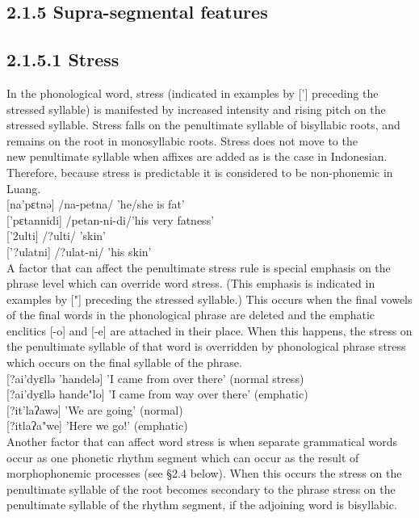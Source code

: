 \documentclass[10pt]{article}
\begin{document}
\subsection*{2.1.5 Supra-segmental features}
\subsection*{2.1.5.1 Stress}
In the phonological word, stress (indicated in examples by ['] preceding the stressed syllable) is manifested by increased intensity and rising pitch on the stressed syllable. Stress falls on the penultimate syllable of bisyllabic roots, and remains on the root in monosyllabic roots. Stress does not move to the\\
new penultimate syllable when affixes are added as is the case in Indonesian. Therefore, because stress is predictable it is considered to be non-phonemic in Luang.\\[0pt]
[na'pɛtnə] /na-petna/ 'he/she is fat'\\[0pt]
['pɛtannidi] /petan-ni-di/'his very fatness'\\[0pt]
['2ulti] /?ulti/ 'skin'\\[0pt]
['?ulatni] /?ulat-ni/ 'his skin'\\[0pt]
A factor that can affect the penultimate stress rule is special emphasis on the phrase level which can override word stress. (This emphasis is indicated in examples by ["] preceding the stressed syllable.) This occurs when the final vowels of the final words in the phonological phrase are deleted and the emphatic enclitics [-o] and [-e] are attached in their place. When this happens, the stress on the penultimate syllable of that word is overridden by phonological phrase stress which occurs on the final syllable of the phrase.\\[0pt]
[?ai'dyɛllə 'handelə] 'I came from over there' (normal stress)\\[0pt]
[?ai'dyɛllə hande"lo] 'I came from way over there' (emphatic)\\[0pt]
[?it'laʔawə] 'We are going' (normal)\\[0pt]
[?itlaʔa"we] 'Here we go!' (emphatic)\\
Another factor that can affect word stress is when separate grammatical words occur as one phonetic rhythm segment which can occur as the result of morphophonemic processes (see §2.4 below). When this occurs the stress on the penultimate syllable of the root becomes secondary to the phrase stress on the penultimate syllable of the rhythm segment, if the adjoining word is bisyllabic.
\end{document}
